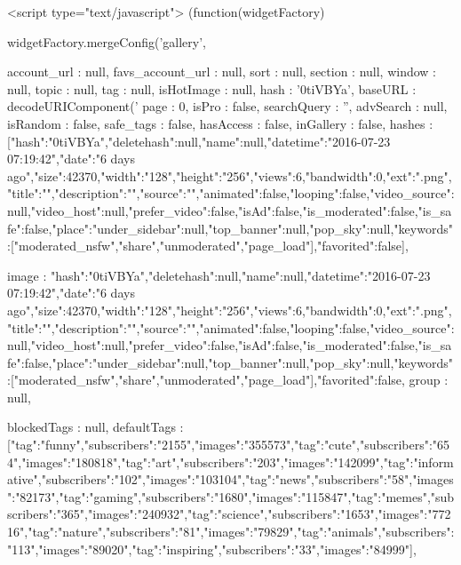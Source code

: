 {{        <script type="text/javascript">
    (function(widgetFactory) {
        widgetFactory.mergeConfig('gallery', {
            account_url         : null,
            favs_account_url    : null,
            sort                : null,
            section             : null,
            window              : null,
            topic               : null,
            tag                 : null,
            isHotImage          : null,
            hash                : '0tiVBYa',
            baseURL             : decodeURIComponent('%
            page                : 0,
            isPro               : false,
            searchQuery         : '',
            advSearch           : null,
            isRandom            : false,
            safe_tags           : false,
            hasAccess           : false,
            inGallery           : false,
            hashes              : [{"hash":"0tiVBYa","deletehash":null,"name":null,"datetime":"2016-07-23 07:19:42","date":"6 days ago","size":42370,"width":"128","height":"256","views":6,"bandwidth":0,"ext":".png","title":"","description":"","source":"","animated":false,"looping":false,"video_source":null,"video_host":null,"prefer_video":false,"isAd":false,"is_moderated":false,"is_safe":false,"place":{"under_sidebar":null,"top_banner":null,"pop_sky":null,"keywords":["moderated_nsfw","share","unmoderated","page_load"]},"favorited":false}],
        
            image               : {"hash":"0tiVBYa","deletehash":null,"name":null,"datetime":"2016-07-23 07:19:42","date":"6 days ago","size":42370,"width":"128","height":"256","views":6,"bandwidth":0,"ext":".png","title":"","description":"","source":"","animated":false,"looping":false,"video_source":null,"video_host":null,"prefer_video":false,"isAd":false,"is_moderated":false,"is_safe":false,"place":{"under_sidebar":null,"top_banner":null,"pop_sky":null,"keywords":["moderated_nsfw","share","unmoderated","page_load"]},"favorited":false},
            group               : null,
        
            blockedTags         : null,
                    defaultTags         : [{"tag":"funny","subscribers":"2155","images":"355573"},{"tag":"cute","subscribers":"654","images":"180818"},{"tag":"art","subscribers":"203","images":"142099"},{"tag":"informative","subscribers":"102","images":"103104"},{"tag":"news","subscribers":"58","images":"82173"},{"tag":"gaming","subscribers":"1680","images":"115847"},{"tag":"memes","subscribers":"365","images":"240932"},{"tag":"science","subscribers":"1653","images":"77216"},{"tag":"nature","subscribers":"81","images":"79829"},{"tag":"animals","subscribers":"113","images":"89020"},{"tag":"inspiring","subscribers":"33","images":"84999"}],
        
}}}}
